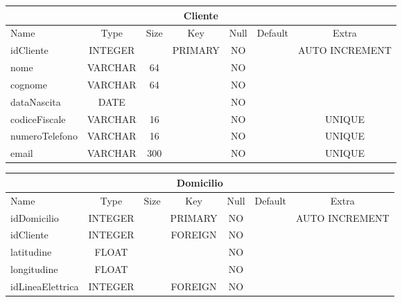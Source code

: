 \begin{center}
    \begin{tabular}{ |l|c|c|c|c|c|c| } 
        \hline
        \multicolumn{7}{|c|}{Cliente} \\
        \hline
            Name             & Type     & Size  & Key       & Null  & Default   & Extra \\
        \hline
            idCliente        & INTEGER  &       & PRIMARY   & NO    &           & AUTO INCREMENT \\
            nome             & VARCHAR  & 64    &           & NO    &           & \\
            cognome          & VARCHAR  & 64    &           & NO    &           & \\
            dataNascita      & DATE     &       &           & NO    &           & \\
            codiceFiscale    & VARCHAR  & 16    &           & NO    &           & UNIQUE \\
            numeroTelefono   & VARCHAR  & 16    &           & NO    &           & UNIQUE \\
            email            & VARCHAR  & 300   &           & NO    &           & UNIQUE \\
        \hline
    \end{tabular}
\end{center}
\begin{center}
    \begin{tabular}{ |l|c|c|c|c|c|c| } 
        \hline
        \multicolumn{7}{|c|}{Domicilio} \\
        \hline
            Name             & Type     & Size  & Key       & Null  & Default   & Extra \\
        \hline
            idDomicilio      & INTEGER  &       & PRIMARY   & NO    &           & AUTO INCREMENT \\
            idCliente        & INTEGER  &       & FOREIGN   & NO    &           & \\
            latitudine       & FLOAT    &       &           & NO    &           & \\
            longitudine      & FLOAT    &       &           & NO    &           & \\
            idLineaElettrica & INTEGER  &       & FOREIGN   & NO    &           & \\
        \hline
    \end{tabular}
\end{center}
